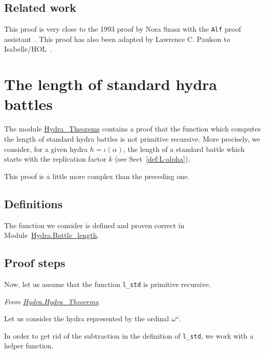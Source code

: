 \subsection{Related work}

This proof is very close to the 1993 proof by Nora Szasz with the \texttt{Alf} proof assistant~\cite{Szasz93}. This proof has also been adapted
by Lawrence C. Paulson to Isabelle/HOL~\cite{paulson_2021}.

\section{The length of standard hydra battles}
\label{sect:battle-length-notPR}

The module \href{../theories/html/hydras.Hydra.Hydra_Theorems.html}{Hydra\_Theorems} contains a proof that the function which computes the length of standard hydra battles is not primitive recursive. More precisely, we consider, for a given hydra $h=\iota(\alpha)$, the length of a standard battle which starts with the replication factor $k$ (see Sect~\vref{def:L-alpha}).

This proof is  a little more complex than the preceding one.

\subsection{Definitions}

The function we consider is defined and proven correct in
Module~\href{../theories/html/hydras.Hydra.Battle_length.html}{Hydra.Battle\_length}.



\subsection{Proof steps}

Now, let us assume that the function \texttt{l\_std} is primitive recursive.


\emph{From \href{../theories/html/hydras.Hydra.Hydra_Theorems.html}{Hydra.Hydra\_Theorems}}.



Let us consider the hydra represented by the ordinal $\omega^\omega$.




In order to get rid of the subtraction in the definition of \texttt{l\_std}, we work with a helper function.

